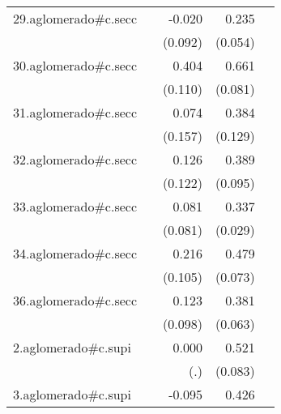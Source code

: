 {\begin{longtable}{l*{4}{D{.}{.}{-1}}}
\addlinespace
29.aglomerado#c.secc&                     &      -0.020         &       0.235\sym{***}&                     \\
            &                     &     (0.092)         &     (0.054)         &                     \\
\addlinespace
30.aglomerado#c.secc&                     &       0.404\sym{***}&       0.661\sym{***}&                     \\
            &                     &     (0.110)         &     (0.081)         &                     \\
\addlinespace
31.aglomerado#c.secc&                     &       0.074         &       0.384\sym{**} &                     \\
            &                     &     (0.157)         &     (0.129)         &                     \\
\addlinespace
32.aglomerado#c.secc&                     &       0.126         &       0.389\sym{***}&                     \\
            &                     &     (0.122)         &     (0.095)         &                     \\
\addlinespace
33.aglomerado#c.secc&                     &       0.081         &       0.337\sym{***}&                     \\
            &                     &     (0.081)         &     (0.029)         &                     \\
\addlinespace
34.aglomerado#c.secc&                     &       0.216\sym{*}  &       0.479\sym{***}&                     \\
            &                     &     (0.105)         &     (0.073)         &                     \\
\addlinespace
36.aglomerado#c.secc&                     &       0.123         &       0.381\sym{***}&                     \\
            &                     &     (0.098)         &     (0.063)         &                     \\
\addlinespace
2.aglomerado#c.supi&                     &       0.000         &       0.521\sym{***}&                     \\
            &                     &         (.)         &     (0.083)         &                     \\
\addlinespace
3.aglomerado#c.supi&                     &      -0.095         &       0.426\sym{***}&                     \\

\end{longtable}}
